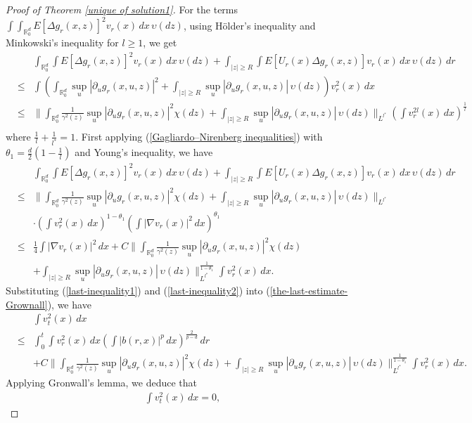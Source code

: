 \documentclass[12pt,oneside, reqno]{amsart}
\newcommand{\be}{\begin{eqnarray}}
\newcommand{\ee}{\end{eqnarray}}
\newcommand{\ce}{\begin{eqnarray*}}
\newcommand{\de}{\end{eqnarray*}}
\def\no{\nonumber}
\def\mR{{\mathbb R}}
\def\geq{\geqslant}
\def\leq{\leqslant}
\numberwithin{equation}{section}
\begin{document}
\begin{proof}[Proof of Theorem \ref{unique of solution1}]
For the  terms $\int \int_{\mR^d_0}E\left[\Delta g_{r}(x,z)\right]^2  v_r(x)\,dx\,\upsilon(dz)$,  using H\"{o}lder's inequality and Minkowski's inequality for $l\geq 1$, we get
 \ce 
 && \int_{\mR^d_0}\int E\left[\Delta g_{r}(x,z)\right]^2  v_r(x)\,dx\,\upsilon(dz)+\int_{|z|\geq R}\int E\left[ U_{r}(x)\Delta g_{r}(x,z)\right] v_r(x)\,dx\,\upsilon(dz)\,dr\\
 &\leq &\int\left(\int_{\mR^d_0}\sup_u|\partial_u  g_{r}(x,u,z)|^2+\int_{|z|\geq R}\sup_u|\partial_u  g_{r}(x,u,z)|\,\upsilon(dz)\right) v_r^2(x)\,dx\\
  &\leq & \big\|\int_{\mR^d_0}\frac{1}{\gamma^2(z)}\sup_u|\partial_u  g_{r}(x,u,z)|^2\chi(dz)+\int_{|z|\geq R}\sup_u|\partial_u  g_{r}(x,u,z)|\,\upsilon(dz)\big\|_{L^{l^*}}\left(\int v_r^{2l}(x)\,dx\right)^{\frac{1}{l}}\\
  \de 
  where  $\frac{1}{l}+\frac{1}{l^*}=1$. First applying (\ref{Gagliardo–Nirenberg inequalities}) with  $\theta_1=\frac{d}{2}\left(1-\frac{1}{l}\right)$ and  Young's inequality, we have 
  \be \label{last-inequality2}
  && \int_{\mR^d_0}\int E\left[\Delta g_{r}(x,z)\right]^2  v_r(x)\,dx\,\upsilon(dz)+\int_{|z|\geq R}\int E\left[ U_{r}(x)\Delta g_{r}(x,z)\right] v_r(x)\,dx\,\upsilon(dz)\,dr\no\\
  &\leq & \big\|\int_{\mR^d_0}\frac{1}{\gamma^2(z)}\sup_u|\partial_u  g_{r}(x,u,z)|^2\chi(dz)+\int_{|z|\geq R}\sup_u|\partial_u  g_{r}(x,u,z)|\,\upsilon(dz)\big\|_{L^{l^*}}\no\\
  &&\cdot\left(\int v_r^{2}(x)\,dx\right)^{1-\theta_1}\left(\int |\nabla v_r(x)|^{2}\,dx\right)^{\theta_1}\no\\
    &\leq &\frac{1}{4}\int |\nabla v_r(x)|^{2}\,dx
    +C\big\|\int_{\mR^d_0}\frac{1}{\gamma^2(z)}\sup_u|\partial_u  g_{r}(x,u,z)|^2\chi(dz)\no\\
    &&+\int_{|z|\geq R}\sup_u|\partial_u  g_{r}(x,u,z)|\,\upsilon(dz)\big\|_{L^{l^*}}^{\frac{1}{1-\theta_1}}\int v_r^{2}(x)\,dx.
 \ee 
 Substituting  (\ref{last-inequality1}) and (\ref{last-inequality2}) into (\ref{the-last-estimate-Grownall}), we have 
 \ce 
 &&\int v_t^2(x)\,dx\\
 &\leq &\int_0^t \int v_r^{2}(x) \,dx\left(\int |b(r,x)|^p \,dx\right)^{\frac{2}{p-d}}\,dr\\
 &&+C\big\|\int_{\mR^d_0}\frac{1}{\gamma^2(z)}\sup_u|\partial_u  g_{r}(x,u,z)|^2\chi(dz)+\int_{|z|\geq R}\sup_u|\partial_u  g_{r}(x,u,z)|\,\upsilon(dz)\big\|_{L^{l^*}}^{\frac{1}{1-\theta_1}}\int v_r^{2}(x)\,dx.
 \de 
 Applying Gronwall's lemma, we deduce that
 \ce 
 \int v_t^2(x)\,dx=0,
 \de 

\end{proof}
\end{document}
